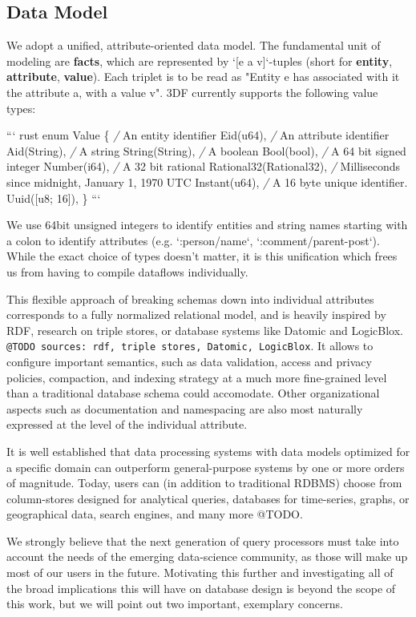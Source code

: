 \documentclass[../index.tex]{subfiles}
\begin{document}
\subsection{Data Model}

We adopt a unified, attribute-oriented data model. The fundamental
unit of modeling are \textbf{facts}, which are represented by `[e a
  v]`-tuples (short for \textbf{entity}, \textbf{attribute},
\textbf{value}). Each triplet is to be read as "Entity e has
associated with it the attribute a, with a value v". 3DF currently
supports the following value types:

``` rust
enum Value \{
    \emph{/} An entity identifier
    Eid(u64),
    \emph{/} An attribute identifier
    Aid(String),
    \emph{/} A string
    String(String),
    \emph{/} A boolean
    Bool(bool),
    \emph{/} A 64 bit signed integer
    Number(i64),
    \emph{/} A 32 bit rational
    Rational32(Rational32),
    \emph{/} Milliseconds since midnight, January 1, 1970 UTC
    Instant(u64),
    \emph{/} A 16 byte unique identifier.
    Uuid([u8; 16]),
\}
```

We use 64bit unsigned integers to identify entities and string names
starting with a colon to identify attributes (e.g. `:person/name`,
`:comment/parent-post`). While the exact choice of types doesn't
matter, it is this unification which frees us from having to compile
dataflows individually.

This flexible approach of breaking schemas down into individual
attributes corresponds to a fully normalized relational model, and is
heavily inspired by RDF, research on triple stores, or database
systems like Datomic and LogicBlox. \texttt{@TODO sources: rdf, triple
stores, Datomic, LogicBlox}. It allows to configure important
semantics, such as data validation, access and privacy policies,
compaction, and indexing strategy at a much more fine-grained level
than a traditional database schema could accomodate. Other
organizational aspects such as documentation and namespacing are also
most naturally expressed at the level of the individual attribute.

It is well established that data processing systems with data models
optimized for a specific domain can outperform general-purpose systems
by one or more orders of magnitude. Today, users can (in addition to
traditional RDBMS) choose from column-stores designed for analytical
queries, databases for time-series, graphs, or geographical data,
search engines, and many more @TODO.

We strongly believe that the next generation of query processors must
take into account the needs of the emerging data-science community, as
those will make up most of our users in the future. Motivating this
further and investigating all of the broad implications this will have
on database design is beyond the scope of this work, but we will point
out two important, exemplary concerns.
\end{document}
